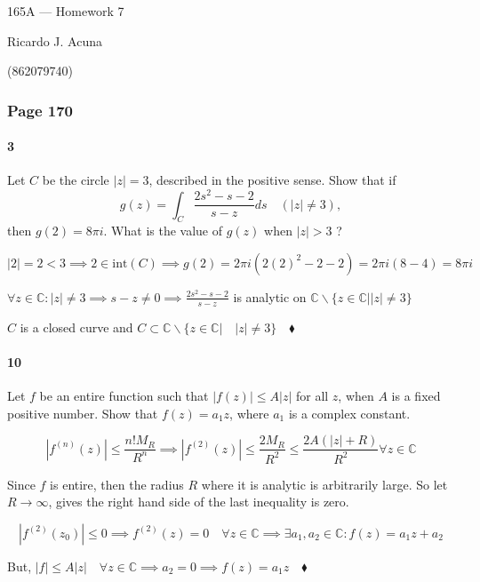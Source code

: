 \documentclass{article}
\newcommand\C{\mathbb{C}}
\begin{document}
\begin{center}
  165A --- Homework 7

  Ricardo J. Acuna

  (862079740)
\end{center}\vspace{1.618em}

\subsubsection*{Page 170}

\paragraph{3} Let $C$ be the circle $|z| = 3$, described in the
positive sense. Show that if$$g(z) = \int_{C} \frac{2s^2 -s -2}{s-z}
ds\quad (|z|\neq 3),$$ then $g(2) = 8\pi i.$ What is the value of
$g(z)$ when $|z|>3$ ?


$|2| = 2 < 3 \implies 2 \in \text{int}(C) \implies g(2) = 2\pi i
(2(2)^2-2-2) = 2\pi i (8-4) = 8\pi i$

$\forall z\in \C: |z|\neq 3 \implies s-z \neq 0 \implies \frac{2s^2 -s
  -2}{s-z}$ is analytic on $\C \backslash \{z\in \C||z|\neq 3\}$

$C$ is a closed curve and $C \subset \C\backslash \{z\in \C|\quad
|z|\neq 3\}\quad \blacklozenge$


\paragraph{10} Let $f$ be an entire function such that $|f(z)|\leq A
|z|$ for all $z$, when $A$ is a fixed positive number. Show that $f(z)
= a_1 z$, where $a_1$ is a complex constant.


$$|f^{(n)}(z)| \leq \frac{n!M_R}{R^n} \implies |f^{(2)}(z)| \leq
\frac{2M_R}{R^2} \leq \frac{2A(|z|+R)}{R^2} \forall z\in \C$$

Since $f$ is entire, then the radius $R$ where it is analytic is
arbitrarily large. So let $R\rightarrow \infty$, gives the right hand
side of the last inequality is zero.

$$|f^{(2)}(z_0)| \leq 0 \implies f^{(2)}(z) = 0\quad \forall z\in \C
\implies \exists a_1,a_2 \in \C : f(z) = a_1z +a_2$$

But, $|f|\leq A|z|\quad \forall z\in \C \implies a_2 = 0 \implies f(z) =
a_1z \quad \blacklozenge$
\end{document}
